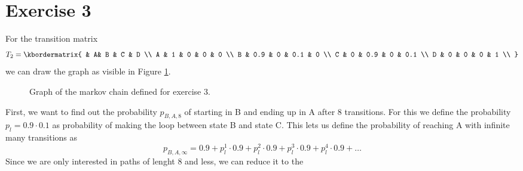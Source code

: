 \documentclass{article}
\begin{document}
\section*{Exercise 3}
For the transition matrix
\[
T_2 = 
\kbordermatrix{
    & A& B     &  C & D     \\
A &   1   &   0   &   0   &   0   \\ 
B &   0.9   &   0   &   0.1   &   0  \\ 
C &   0   &   0.9   &   0   &   0.1   \\ 
D &   0   &   0   &   0   &   1   \\ 
}
\]
we can draw the graph as visible in Figure \ref{fig:ex3}.
\begin{figure}[h]
\center
{}
\label{fig:ex3}
\caption{Graph of the markov chain defined for exercise 3.}
\end{figure}
First, we want to find out the probability $p_{B,A,8}$ of starting in B and ending up in A
after 8 transitions. For this we define the probability $p_l = 0.9 \cdot 0.1$ as probability of making
the loop between state B and state C. This lets us define the probability of reaching A
with infinite many transitions as
\begin{equation}
	p_{B,A,\infty} = 0.9 + p_l^1 \cdot 0.9 + p_l^2 \cdot 0.9 + p_l^3 \cdot 0.9 +  p_l^4 \cdot 0.9 + \ldots
\end{equation}
Since we are only interested in paths of lenght 8 and less, we can reduce it to the 
\end{document}
